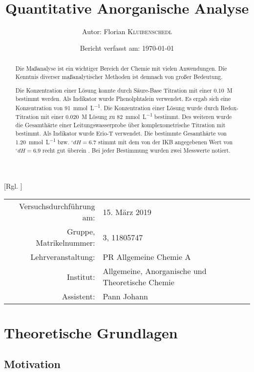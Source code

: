 \documentclass{article}
\title{Quantitative Anorganische Analyse \cite{Versuchsvorschrift}} %
\author{Autor: Florian \textsc{Kluibenschedl}} %
\date{Bericht verfasst am: \today} %
\begin{document}
  [Rgl. ]{}{}
  
  \maketitle %
  
  \begin{center}
    \begin{tabular}{r p{4cm}}
      Versuchsdurchführung am: & 15. März 2019\\ %
      Gruppe, Matrikelnummer: & 3, 11805747 \\
      Lehrveranstaltung: & PR Allgemeine Chemie A \\
      Institut: & Allgemeine, Anorganische und Theoretische Chemie \\
      Assistent: & Pann Johann %
    \end{tabular}
  \end{center}


  \begin{abstract}
    Die Maßanalyse ist ein wichtiger Bereich der Chemie mit vielen Anwendungen. Die Kenntnis diverser maßanalytischer Methoden ist demnach von großer Bedeutung. 
    
    Die Konzentration einer  Lösung konnte durch Säure-Base Titration mit einer \SI[mode=text]{0.10}{M}  bestimmt werden. Als Indikator wurde Phenolphtalein verwendet. Es ergab sich eine Konzentration von \SI[mode=text]{91}{\milli\mole\per\liter}. Die Konzentration einer  Lösung wurde durch Redox-Titration mit einer \SI[mode=text]{0.020}{M}  Lösung zu \SI[mode=text]{82}{\milli\mole\per\liter} bestimmt. Des weiteren wurde die Gesamthärte einer Leitungswasserprobe über komplexometrische Titration mit  bestimmt. Als Indikator wurde Erio-T verwendet. Die bestimmte Gesamthärte von \SI[mode=text]{1.20}{\milli\mole\per\liter} bzw. $^\circ dH = 6.7$ stimmt mit dem von der IKB angegebenen Wert von $^\circ dH = 6.9$ recht gut überein \cite{ikb}. Bei jeder Bestimmung wurden zwei Messwerte notiert. 
  \end{abstract}
  
  \pagebreak 
  
  \section{Theoretische Grundlagen}
  
    \subsection{Motivation} \label{sec:Motivation}
      
\end{document}
